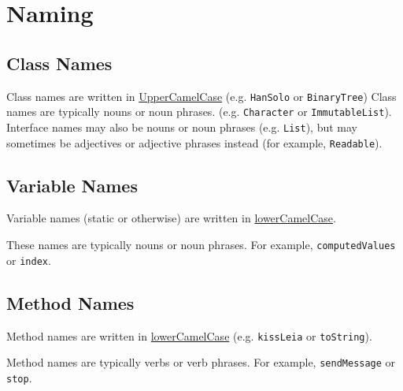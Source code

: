 \documentclass[11pt,DIV=23,landscape]{scrartcl}
\begin{document}
\newpage
\section{Naming}\label{naming}

\begin{paracol}{3}
\begin{nthcolumn}{0}
\subsection{Class Names}\label{class-names}

Class names are written in
\href{https://google.github.io/styleguide/javaguide.html\#s5.3-camel-case}{UpperCamelCase}
(e.g. \lstinline{HanSolo} or \lstinline{BinaryTree}) Class names are typically
nouns or noun phrases. (e.g. \lstinline{Character} or \lstinline{ImmutableList}). Interface names may also be nouns or noun
phrases (e.g. \lstinline{List}), but may sometimes be adjectives or
adjective phrases instead (for example, \lstinline{Readable}).

\end{nthcolumn}
\begin{nthcolumn}{1}

\subsection{Variable Names}\label{variable-names}

Variable names (static or otherwise) are written in
\href{https://google.github.io/styleguide/javaguide.html\#s5.3-camel-case}{lowerCamelCase}.

These names are typically nouns or noun phrases. For example,
\lstinline{computedValues} or \lstinline{index}.

\end{nthcolumn}
\begin{nthcolumn}{2}
\subsection{Method Names}\label{method-names}

Method names are written in \href{https://google.github.io/styleguide/javaguide.html\#s5.3-camel-case}{lowerCamelCase}
(e.g. \lstinline{kissLeia} or \lstinline{toString}).

Method names are typically verbs or verb phrases. For example,
\lstinline{sendMessage} or \lstinline{stop}.
\end{nthcolumn}
\end{paracol}
\end{document}
